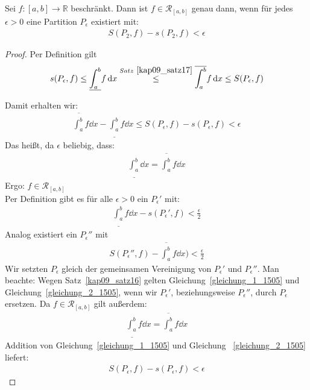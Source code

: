 
\begin{Satz}{\label{kap_10_satz18}
	Sei $f: [a,b] \rightarrow \mathbb{R}$ beschränkt. Dann ist 
	$f \in \mathcal{R}_{[a,b]}$ genau dann, wenn für jedes $\epsilon > 0$ eine 
	Partition $P_{\epsilon}$ existiert mit:
	\begin{align*}
		S(P_2,f) - s(P_2,f) < \epsilon
	\end{align*}
}\end{Satz}

\begin{proof}
	 Per Definition gilt 
	\begin{align*}
		s(P_{\epsilon},f) \leq \underline{\int_{a}^b} f \dd{x}
		\overset{Satz~\ref{kap09_satz17}}{\le} \overline{\int_a^b} f \dd{x} 
		\leq S(P_{\epsilon},f) 		
	\end{align*}

	Damit erhalten wir:
	\begin{align*}
		\overline{\int_a^b} f \dd{x} - 
		\underline{\int_{a}^b} f \dd{x} \leq S(P_{\epsilon},f) 
		- s(P_{\epsilon},f) < \epsilon
	\end{align*}
	Das heißt, da $\epsilon$ beliebig, dass:
	\begin{align*}
		\underline{\int_{a}^b} \dd{x} = \overline{\int_a^b} f \dd{x}
	\end{align*}
	Ergo: $f \in \mathcal{R}_{[a,b]}$ \\
	Per Definition gibt es für alle $\epsilon > 0$ ein $P_{\epsilon}'$ mit:
	\begin{align}
		\label{gleichung_1_1505}
		\underline{\int_{a}^b} f \dd{x} - s(P_{\epsilon}',f) < \frac{\epsilon}{2} 
	\end{align}
	Analog existiert ein $P_{\epsilon}''$ mit 
	\begin{align}
		\label{gleichung_2_1505}
		S(P_{\epsilon}'',f) - \overline{\int_a^{b}} f \dd{x}) < \frac{\epsilon}{2}
	\end{align}
	Wir setzten $P_{\epsilon}$ gleich der gemeinsamen Vereinigung von 
	$P_{\epsilon}'$ und $P_{\epsilon}''$. Man beachte: Wegen Satz~\ref{kap09_satz16} 
	gelten Gleichung~\ref{gleichung_1_1505} und Gleichung~\ref{gleichung_2_1505},
	wenn wir $P_{\epsilon}'$, beziehungsweise $P_{\epsilon}''$, durch $P_{\epsilon}$
	ersetzen. Da $f \in \mathcal{R}_{[a,b]}$ gilt außerdem:
	\begin{align*}
		\underline{\int_{a}^b} f \dd{x} = \overline{\int_a^{b}} f\dd{x}
	\end{align*}	 
	Addition von Gleichung~\ref{gleichung_1_1505} und Gleichung~
	\ref{gleichung_2_1505} liefert:
	\begin{align*}
	S(P_{\epsilon},f) - s(P_{\epsilon},f) < \epsilon
	\end{align*}
\end{proof}

